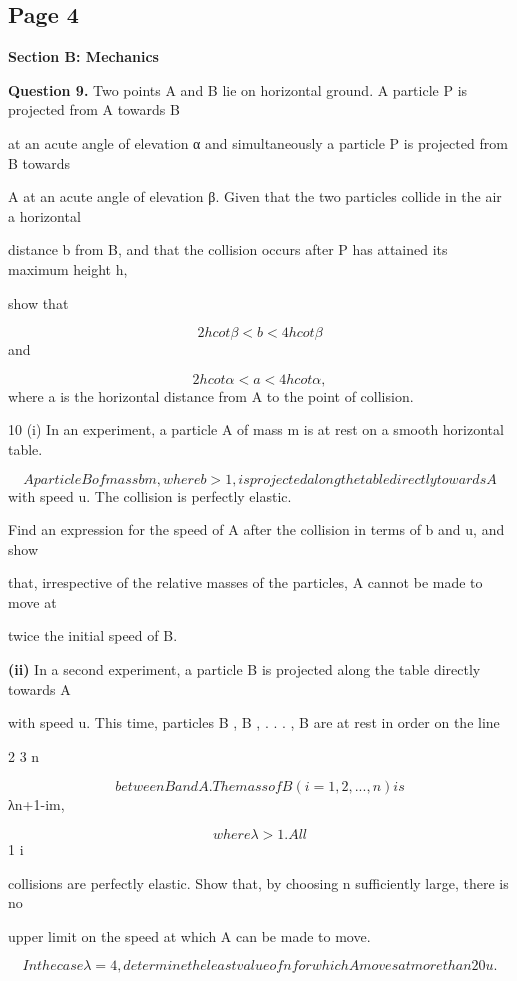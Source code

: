 \documentclass[12pt]{article}
\begin{document}
\subsection*{Page 4}
\begin{flushleft}
\bigskip\textbf{Section B: Mechanics}\par
\bigskip\textbf{Question 9.} Two points A and B lie on horizontal ground. A particle P is projected from A towards B\par
at an acute angle of elevation α and simultaneously a particle P is projected from B towards\par
A at an acute angle of elevation β. Given that the two particles collide in the air a horizontal\par
distance b from B, and that the collision occurs after P has attained its maximum height h,\par
show that\par
\[2h cot β < b < 4h cot β\]
and\par
\[2h cot α < a < 4h cot α ,\]
where a is the horizontal distance from A to the point of collision.\par
10 (i) In an experiment, a particle A of mass m is at rest on a smooth horizontal table.\par
\[A particle B of mass bm, where b > 1, is projected along the table directly towards A\]
with speed u. The collision is perfectly elastic.\par
Find an expression for the speed of A after the collision in terms of b and u, and show\par
that, irrespective of the relative masses of the particles, A cannot be made to move at\par
twice the initial speed of B.\par
\textbf{(ii)} In a second experiment, a particle B is projected along the table directly towards A\par
with speed u. This time, particles B , B , . . . , B are at rest in order on the line\par
2 3 n\par
\[between B and A. The mass of B (i = 1, 2, . . . , n) is\]
λn+1-im,\par
\[where λ > 1. All\]
1 i\par
collisions are perfectly elastic. Show that, by choosing n sufficiently large, there is no\par
upper limit on the speed at which A can be made to move.\par
\[In the case λ = 4, determine the least value of n for which A moves at more than 20u.\]

\end{flushleft}
\end{document}
